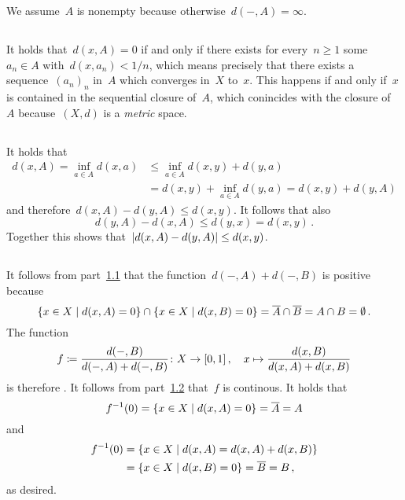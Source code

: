 \section{}


We assume~$A$ is nonempty because otherwise~$d(-,A) = \infty$.



\subsection{}
\label{distance for closed}

It holds that~$d(x,A) = 0$ if and only if there exists for every~$n \geq 1$ some~$a_n \in A$ with~$d(x,a_n) < 1/n$, which means precisely that there exists a sequence~$(a_n)_n$ in~$A$ which converges in~$X$ to~$x$.
This happens if and only if~$x$ is contained in the sequential closure of~$A$, which conincides with the closure of~$A$ because~$(X,d)$ is a \emph{metric} space.





\subsection{}
\label{distance is lipschitz}

It holds that
\begin{align*}
          d(x,A)
   =      \inf_{a \in A} d(x,a)
  &\leq   \inf_{a \in A} d(x,y) + d(y,a)  \\
  &=      d(x,y) + \inf_{a \in A} d(y,a)
   =      d(x,y) + d(y,A)
\end{align*}
and therefore~$d(x,A) - d(y,A) \leq d(x,y)$.
It follows that also
\[
        d(y,A) - d(x,A) 
  \leq  d(y,x)
  =     d(x,y) \,.
\]
Together this shows that~$\lvert d(x,A) - d(y,A) \rvert \leq d(x,y)$.





\subsection{}

It follows from part~\ref{distance for closed} that the function~$d(-,A) + d(-,B)$ is positive because
\[
    \{x \in X \suchthat d(x,A) = 0\} \cap \{x \in X \suchthat d(x,B) = 0\}
  = \closure{A} \cap \closure{B}
  = A \cap B
  = \emptyset \,.
\]
The function
\[
            f
  \coloneqq  \frac{d(-,B)}{d(-,A) + d(-,B)}
  \colon    X
  \to       [0,1] \,,
  \quad     x
  \mapsto   \frac{d(x,B)}{d(x,A) + d(x,B)}
\]
is therefore {\welldef}.
It follows from part~\ref{distance is lipschitz} that~$f$ is continous.
It holds that
\[
    f^{-1}(0)
  = \{
      x \in X
    \suchthat
      d(x,A) = 0
    \}
  = \closure{A}
  = A
\]
and
\begin{align*}
      f^{-1}(0)
  &=  \{
        x \in X
      \suchthat
        d(x,A) = d(x,A) + d(x,B)
      \}  \\
  &=  \{
        x \in X
      \suchthat
        d(x,B) = 0
      \}
  =   \closure{B}
  =   B \,,
\end{align*}
as desired.




